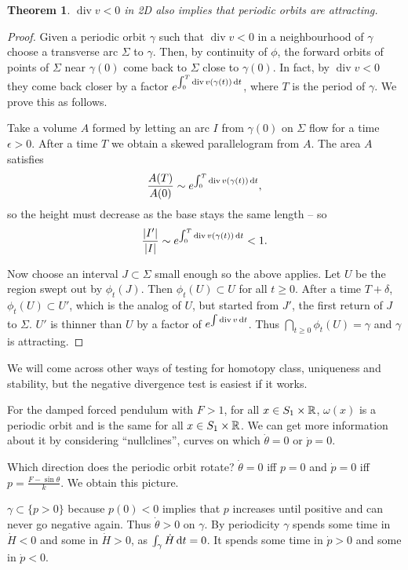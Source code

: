 \documentclass{notes}
\theoremstyle{plain}
\newtheorem*{theorem}{Theorem}
\DeclareMathOperator{\dive}{div}
\begin{document}
\begin{theorem}
$\dive v < 0$ in 2D also implies that periodic orbits are attracting.
\end{theorem}

\begin{proof}
Given a periodic orbit $\gamma$ such that $\dive v < 0$ in a neighbourhood
of $\gamma$ choose a transverse arc $\Sigma$ to $\gamma$.  Then, by continuity
of $\phi$, the forward orbits of points of $\Sigma$ near $\gamma(0)$
come back to $\Sigma$ close to $\gamma(0)$.  In fact, by $\dive v < 0$ they
come back closer by a factor $e^{\int_0^T \dive v(\gamma(t))\, \ud t}$, where
$T$ is the period of $\gamma$.  We prove this as follows.

Take a volume $A$ formed by letting an arc $I$ from $\gamma(0)$ on $\Sigma$
flow for a time $\epsilon > 0$.  After a time $T$ we obtain a skewed 
parallelogram from $A$.  The area $A$ satisfies
\[
\frac{A(T)}{A(0)} \sim e^{\int_0^T \dive v(\gamma(t))\,\ud t},
\]
so the height must decrease as the base stays the same length -- so
\[
\frac{\abs{I'}}{\abs{I}} \sim e^{\int_0^T \dive v(\gamma(t))\, \ud t} < 1.
\]

Now choose an interval $J \subset \Sigma$ small enough so the above applies.
Let $U$ be the region swept out by $\phi_t(J)$.  Then $\phi_t(U) \subset U$
for all $t \ge 0$.  After a time $T + \delta$, $\phi_t(U) \subset U'$,
which is the analog of $U$, but started from $J'$, the first return of $J$
to $\Sigma$.  $U'$ is thinner than $U$ by a factor of $e^{\int \dive
  v\, \ud t}$.
Thus $\bigcap_{t \ge 0} \phi_t(U) = \gamma$ and $\gamma$ is attracting.
\end{proof}

We will come across other ways of testing for homotopy class, uniqueness
and stability, but the negative divergence test is easiest if it works.

For the damped forced pendulum with $F>1$, for all $x \in S_1 \times \mathbb{R}$,
$\omega(x)$ is a periodic orbit and is the same for all $x \in S_1 \times \mathbb{R}$.
We can get more information about it by considering ``nullclines'', curves
on which $\dot{\theta}=0$ or $\dot{p} = 0$.

Which direction does the periodic orbit rotate?  $\dot{\theta}=0$ iff
$p = 0$ and $\dot{p} = 0$ iff $p = \frac{F - \sin \theta}{k}$.  We obtain
this picture.

\newpage

$\gamma \subset \{ p > 0 \}$ because $p(0) < 0$ implies that $p$ increases
until positive and can never go negative again.  Thus $\dot{\theta} > 0$ on
$\gamma$. By periodicity $\gamma$ spends some time in $\dot{H} < 0$ and
some in $\dot{H} > 0$, as $\int_\gamma \dot{H}\,\mathrm{d} t = 0$.  It spends some
time in $\dot{p} > 0$ and some in $\dot{p} < 0$.
\end{document}
